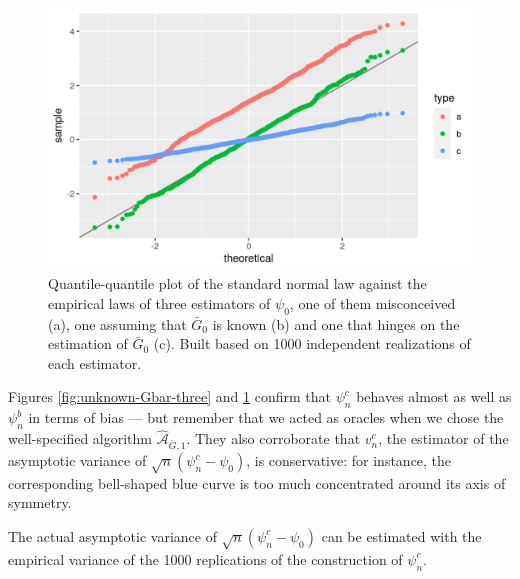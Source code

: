 \documentclass[
  11pt,
  openright,twoside]{book}
\newcommand{\Algo}{\widehat{\mathcal{A}}}
\newcommand{\Gbar}{\bar{G}}
\theoremstyle{definition}
\theoremstyle{definition}
\theoremstyle{definition}
\theoremstyle{definition}
\theoremstyle{remark}
\begin{document}
\begin{figure}

{\centering \includegraphics[width=0.7\linewidth]{img/unknown-Gbar-four-1} 

}

\caption{Quantile-quantile plot of the standard normal law against the empirical laws of three estimators of \(\psi_{0}\), one of them misconceived (a), one assuming that \(\Gbar_{0}\) is known (b) and one that hinges on the estimation of \(\Gbar_{0}\) (c). Built based on 1000 independent realizations of each estimator.}\label{fig:unknown-Gbar-four}
\end{figure}

Figures \ref{fig:unknown-Gbar-three} and \ref{fig:unknown-Gbar-four} confirm
that \(\psi_{n}^{c}\) behaves almost as well as \(\psi_{n}^{b}\) in terms of bias --- but
remember that we acted as oracles when we chose the well-specified algorithm
\(\Algo_{\Gbar,1}\). They also corroborate that \(v_{n}^{c}\), the estimator of
the asymptotic variance of \(\sqrt{n} (\psi_{n}^{c} - \psi_{0})\), is
conservative: for instance, the corresponding bell-shaped blue curve is too
much concentrated around its axis of symmetry.

The actual asymptotic variance of \(\sqrt{n} (\psi_{n}^{c} - \psi_{0})\) can be
estimated with the empirical variance of the 1000 replications of the
construction of \(\psi_{n}^{c}\).
\end{document}
